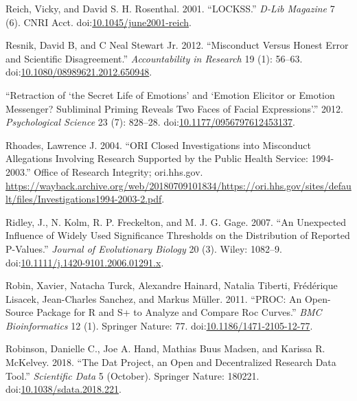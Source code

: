 \documentclass[a5paper]{book}
\begin{document}
\hypertarget{ref-doi:10.1045ux2fjune2001-reich}{}
Reich, Vicky, and David S. H. Rosenthal. 2001. ``LOCKSS.'' \emph{D-Lib
Magazine} 7 (6). CNRI Acct.
doi:\href{https://doi.org/10.1045/june2001-reich}{10.1045/june2001-reich}.

\hypertarget{ref-doi:10.1080ux2f08989621.2012.650948}{}
Resnik, David B, and C Neal Stewart Jr. 2012. ``Misconduct Versus Honest
Error and Scientific Disagreement.'' \emph{Accountability in Research}
19 (1): 56--63.
doi:\href{https://doi.org/10.1080/08989621.2012.650948}{10.1080/08989621.2012.650948}.

\hypertarget{ref-doi:10.1177ux2f0956797612453137}{}
``Retraction of `the Secret Life of Emotions' and `Emotion Elicitor or
Emotion Messenger? Subliminal Priming Reveals Two Faces of Facial
Expressions'.'' 2012. \emph{Psychological Science} 23 (7): 828--28.
doi:\href{https://doi.org/10.1177/0956797612453137}{10.1177/0956797612453137}.

\hypertarget{ref-rhoades2004}{}
Rhoades, Lawrence J. 2004. ``ORI Closed Investigations into Misconduct
Allegations Involving Research Supported by the Public Health Service:
1994-2003.'' Office of Research Integrity; ori.hhs.gov.
\url{https://wayback.archive.org/web/20180709101834/https://ori.hhs.gov/sites/default/files/Investigations1994-2003-2.pdf}.

\hypertarget{ref-doi:10.1111ux2fj.1420-9101.2006.01291.x}{}
Ridley, J., N. Kolm, R. P. Freckelton, and M. J. G. Gage. 2007. ``An
Unexpected Influence of Widely Used Significance Thresholds on the
Distribution of Reported P-Values.'' \emph{Journal of Evolutionary
Biology} 20 (3). Wiley: 1082--9.
doi:\href{https://doi.org/10.1111/j.1420-9101.2006.01291.x}{10.1111/j.1420-9101.2006.01291.x}.

\hypertarget{ref-doi:10.1186ux2f1471-2105-12-77}{}
Robin, Xavier, Natacha Turck, Alexandre Hainard, Natalia Tiberti,
Frédérique Lisacek, Jean-Charles Sanchez, and Markus Müller. 2011.
``PROC: An Open-Source Package for R and S+ to Analyze and Compare Roc
Curves.'' \emph{BMC Bioinformatics} 12 (1). Springer Nature: 77.
doi:\href{https://doi.org/10.1186/1471-2105-12-77}{10.1186/1471-2105-12-77}.

\hypertarget{ref-doi:10.1038ux2fsdata.2018.221}{}
Robinson, Danielle C., Joe A. Hand, Mathias Buus Madsen, and Karissa R.
McKelvey. 2018. ``The Dat Project, an Open and Decentralized Research
Data Tool.'' \emph{Scientific Data} 5 (October). Springer Nature:
180221.
doi:\href{https://doi.org/10.1038/sdata.2018.221}{10.1038/sdata.2018.221}.
\end{document}
